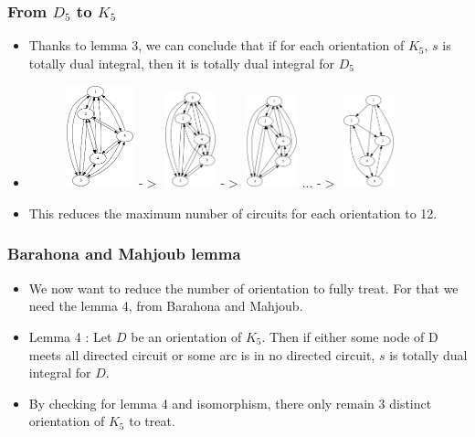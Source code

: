 \documentclass{beamer}
\begin{document}
\begin{frame}
	\frametitle{From $D_5$ to $K_5$}
	\begin{itemize}
		\item Thanks to lemma 3, we can conclude that if for each orientation of $K_5$, $s$ is totally dual integral, then it is totally dual integral for $D_5$
		\item 
		\begin{figure}
			\centering
			\includegraphics[width=2cm]{images/D5.png}
			-$>$
			\includegraphics[width=1.5cm]{images/d5-1.png}
			-$>$
			\includegraphics[width=1.5cm]{images/d5-2.png}
			...
			-$>$
			\includegraphics[width=1.5cm]{images/d9.png}
		\end{figure}
		\item This reduces the maximum number of circuits for each orientation to 12.
	\end{itemize}
\end{frame}

\begin{frame}
	\frametitle{Barahona and Mahjoub lemma}
	\begin{itemize}
		\item We now want to reduce the number of orientation to fully treat. For that we need the lemma 4, from Barahona and Mahjoub.
		\item Lemma 4 : Let $D$ be an orientation of $K_5$. Then if either some node of D meets all directed circuit or some arc is in no directed circuit, $s$ is totally dual integral for $D$.
		\item By checking for lemma 4 and isomorphism, there only remain 3 distinct orientation of $K_5$ to treat.
	\end{itemize}
\end{frame}
\end{document}
